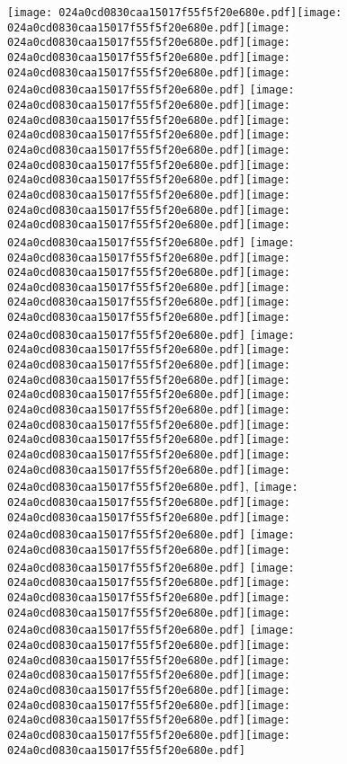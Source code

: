 \documentclass{article}
\newcommand{\origpg}[2]{\texttt{[image: 024a0cd0830caa15017f55f5f20e680e.pdf]}}
\begin{document}
{\vspace{10.282pt}\hspace{35.438pt}\origpg9{120.74pt 203.85pt 132.39pt 219.99pt}\hspace{-0.339pt}\origpg9{132.06pt 203.85pt 140.69pt 219.99pt}\origpg9{140.69pt 203.85pt 147.86pt 219.99pt}\hspace{0.323pt}\origpg9{148.18pt 203.85pt 156.23pt 219.99pt}\origpg9{156.14pt 203.85pt 164.77pt 219.99pt}\origpg9{164.77pt 203.85pt 171.15pt 219.99pt} \origpg9{176.34pt 203.85pt 184.98pt 219.99pt}\origpg9{184.98pt 203.85pt 193.05pt 219.99pt}\hspace{-0.323pt}\origpg9{192.73pt 203.85pt 200.78pt 219.99pt}\origpg9{200.68pt 203.85pt 208.75pt 219.99pt}\hspace{-0.355pt}\origpg9{208.4pt 203.85pt 216.52pt 219.99pt}\origpg9{216.57pt 203.85pt 223.73pt 219.99pt}\hspace{-0.178pt}\origpg9{223.55pt 203.85pt 232.19pt 219.99pt}\origpg9{232.19pt 203.85pt 240.82pt 219.99pt}\origpg9{240.89pt 203.85pt 251.74pt 219.99pt}\origpg9{251.74pt 203.85pt 259.81pt 219.99pt} \origpg9{264.95pt 203.85pt 273.17pt 219.99pt}\origpg9{273.17pt 203.85pt 280.34pt 219.99pt}\origpg9{280.34pt 203.85pt 288.97pt 219.99pt}\origpg9{289.04pt 203.85pt 297.67pt 219.99pt}\origpg9{297.67pt 203.85pt 308.52pt 219.99pt}\origpg9{308.52pt 203.85pt 316.59pt 219.99pt} \origpg9{321.53pt 203.85pt 330.16pt 219.99pt}\origpg9{330.16pt 203.85pt 338.23pt 219.99pt}\origpg9{338.15pt 203.85pt 346pt 219.99pt}\hspace{-0.371pt}\origpg9{345.62pt 203.85pt 352.79pt 219.99pt}\origpg9{352.84pt 203.85pt 359.21pt 219.99pt}\hspace{-0.113pt}\origpg9{359.1pt 203.85pt 369.95pt 219.99pt}\origpg9{369.95pt 203.85pt 377.57pt 219.99pt}\hspace{-0.161pt}\origpg9{377.4pt 203.85pt 384.57pt 219.99pt}\origpg9{384.62pt 203.85pt 391.79pt 219.99pt}\hspace{-0.178pt}\origpg9{391.61pt 203.85pt 398.66pt 219.99pt}\hspace{-1.275pt}, \origpg9{406.51pt 203.85pt 414.62pt 219.99pt}\origpg9{414.67pt 203.85pt 421.73pt 219.99pt}\hspace{-0.307pt}\origpg9{421.42pt 203.85pt 429.49pt 219.99pt} \origpg9{434.65pt 203.85pt 443.29pt 219.99pt}\origpg9{443.29pt 203.85pt 451.36pt 219.99pt} \origpg9{456.31pt 203.85pt 466.53pt 219.99pt}\origpg9{466.43pt 203.85pt 473.6pt 219.99pt}\hspace{-0.178pt}\origpg9{473.42pt 203.85pt 481.49pt 219.99pt}\origpg9{481.59pt 203.85pt 488.76pt 219.99pt} \origpg9{493.86pt 203.85pt 501.93pt 219.99pt}\hspace{-0.113pt}\origpg9{501.81pt 203.85pt 508.98pt 219.99pt}\origpg9{509.03pt 203.85pt 515.4pt 219.99pt}\hspace{-0.113pt}\origpg9{515.29pt 203.85pt 522.91pt 219.99pt}\origpg9{522.99pt 203.85pt 531.62pt 219.99pt}\origpg9{531.62pt 203.85pt 538.68pt 219.99pt}\origpg9{538.68pt 203.85pt 547.31pt 219.99pt}\hspace{-0.226pt}\origpg9{547.09pt 203.85pt 554.51pt 219.99pt} 

}
\end{document}
